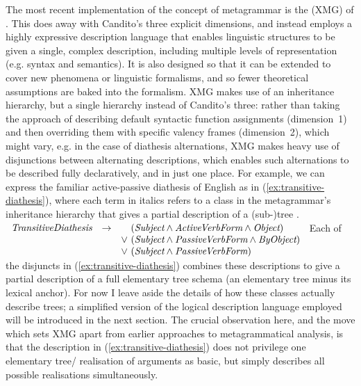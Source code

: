 \documentclass[output=paper,hidelinks]{langscibook}
\begin{document}
The most recent implementation of the concept of metagrammar is the
 (XMG) of \citet{crabbe:xmg}. This does away with
Candito's three explicit dimensions, and instead employs a highly expressive
description language that enables linguistic structures to be given a single,
complex description, including multiple levels of representation (e.g. syntax
and semantics). It is also designed so that it can be extended to cover new
phenomena or linguistic formalisms, and so fewer theoretical assumptions are
baked into the formalism. XMG makes use of an inheritance hierarchy, but a
single hierarchy instead of Candito's three: rather than taking the approach of
describing default syntactic function assignments (dimension~1) and then
overriding them with specific valency frames (dimension~2), which might vary,
e.g. in the case of diathesis alternations, XMG makes heavy use of disjunctions
between alternating descriptions, which enables such alternations to be
described fully declaratively, and in just one place. For example, we can
express the familiar active-passive diathesis of English as in
(\ref{ex:transitive-diathesis}), where each term in italics refers to a class in
the metagrammar's inheritance hierarchy that gives a partial description of a
(sub-)tree \citep[616]{crabbe:xmg}. \ea\label{ex:transitive-diathesis} $
\begin{array}[t]{lcl}
  \textit{TransitiveDiathesis}& \rightarrow &\phantom{\lor\ } (\textit{Subject} \land
                                              \textit{ActiveVerbForm} \land
                                              \textit{Object})\\
                              &&\lor\ (\textit{Subject} \land \textit{PassiveVerbForm} \land \textit{ByObject})\\
  &&\lor\ (\textit{Subject} \land \textit{PassiveVerbForm})
\end{array}
$
\z
\noindent Each of the disjuncts in (\ref{ex:transitive-diathesis}) combines
these descriptions to give a partial description of a full elementary tree
schema (an elementary tree minus its lexical anchor). For now I leave aside the
details of how these classes actually describe trees; a simplified version of
the logical description language employed will be introduced in the next
section. The crucial observation here, and the move which sets XMG apart from
earlier approaches to metagrammatical analysis, is that the description in
(\ref{ex:transitive-diathesis}) does not privilege one elementary tree\slash
realisation of arguments as basic, but simply describes all possible
realisations simultaneously.
\end{document}
